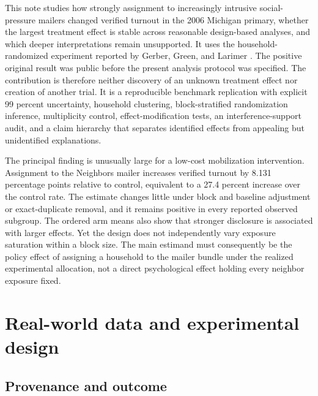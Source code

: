 \documentclass[a4paper,12pt]{article}
\begin{document}
This note studies how strongly assignment to increasingly intrusive social-pressure mailers changed verified turnout in the 2006 Michigan primary, whether the largest treatment effect is stable across reasonable design-based analyses, and which deeper interpretations remain unsupported. It uses the household-randomized experiment reported by Gerber, Green, and Larimer \cite{gerber2008}. The positive original result was public before the present analysis protocol was specified. The contribution is therefore neither discovery of an unknown treatment effect nor creation of another trial. It is a reproducible benchmark replication with explicit 99 percent uncertainty, household clustering, block-stratified randomization inference, multiplicity control, effect-modification tests, an interference-support audit, and a claim hierarchy that separates identified effects from appealing but unidentified explanations.

The principal finding is unusually large for a low-cost mobilization intervention. Assignment to the Neighbors mailer increases verified turnout by 8.131 percentage points relative to control, equivalent to a 27.4 percent increase over the control rate. The estimate changes little under block and baseline adjustment or exact-duplicate removal, and it remains positive in every reported observed subgroup. The ordered arm means also show that stronger disclosure is associated with larger effects. Yet the design does not independently vary exposure saturation within a block size. The main estimand must consequently be the policy effect of assigning a household to the mailer bundle under the realized experimental allocation, not a direct psychological effect holding every neighbor exposure fixed.

\section{Real-world data and experimental design}

\subsection{Provenance and outcome}
\end{document}
